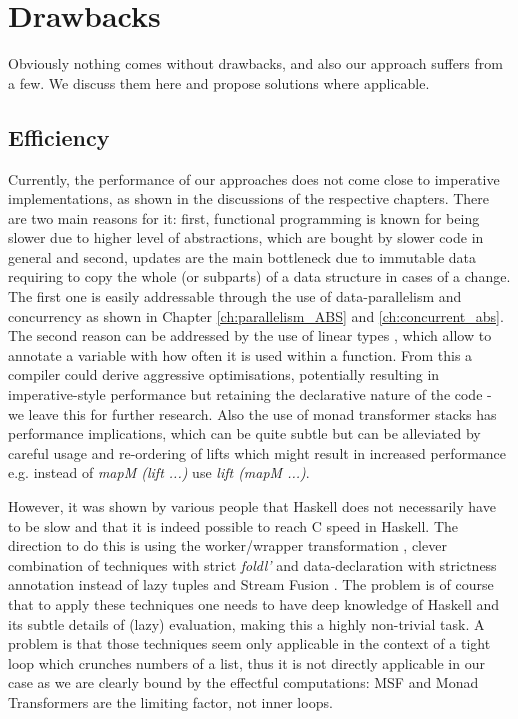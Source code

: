 \section{Drawbacks}
\label{sec:drawbacks}
Obviously nothing comes without drawbacks, and also our approach suffers from a few. We discuss them here and propose solutions where applicable.

\subsection{Efficiency}
\label{sec:drawback_efficiency}
Currently, the performance of our approaches does not come close to imperative implementations, as shown in the discussions of the respective chapters. There are two main reasons for it: first, functional programming is known for being slower due to higher level of abstractions, which are bought by slower code in general and second, updates are the main bottleneck due to immutable data requiring to copy the whole (or subparts) of a data structure in cases of a change. The first one is easily addressable through the use of data-parallelism and concurrency as shown in Chapter \ref{ch:parallelism_ABS} and \ref{ch:concurrent_abs}. The second reason can be addressed by the use of linear types \cite{bernardy_linear_2017}, which allow to annotate a variable with how often it is used within a function. From this a compiler could derive aggressive optimisations, potentially resulting in imperative-style performance but retaining the declarative nature of the code - we leave this for further research. Also the use of monad transformer stacks has performance implications, which can be quite subtle but can be alleviated by careful usage and re-ordering of lifts which might result in increased performance e.g. instead of \textit{mapM (lift ...)} use \textit{lift (mapM ...)}.

However, it was shown by various people \cite{kqr_competing_2017, stewart_haskell_2008, stolarek_haskell_2013} that Haskell does not necessarily have to be slow and that it is indeed possible to reach C speed in Haskell. The direction to do this is using the worker/wrapper transformation \cite{gill_worker/wrapper_2009}, clever combination of techniques with strict \textit{foldl'} and data-declaration with strictness annotation instead of lazy tuples and Stream Fusion \cite{coutts_stream_2007, mainland_haskell_2013}. The problem is of course that to apply these techniques one needs to have deep knowledge of Haskell and its subtle details of (lazy) evaluation, making this a highly non-trivial task. A problem is that those techniques seem only applicable in the context of a tight loop which crunches numbers of a list, thus it is not directly applicable in our case as we are clearly bound by the effectful computations: MSF and Monad Transformers are the limiting factor, not inner loops.

